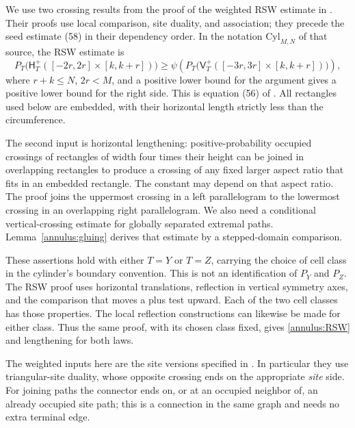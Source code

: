 We use two crossing results from the proof of the weighted RSW estimate
in \cite[Appendix~A, pp.~46--47]{GL2025}.  Their proofs use local
comparison, site duality, and association; they precede the seed estimate
(58) in their dependency order.  In the notation $\mathrm{Cyl}_{M,N}$
of that source, the RSW estimate is
\begin{equation}\label{annulus:RSW}
 P_T\bigl(\mathsf H_T^+([-2r,2r]\times[k,k+r])\bigr)
 \geq
 \psi\!\left(P_T\bigl(\mathsf V_T^+([-3r,3r]\times[k,k+r])\bigr)\right),
\end{equation}
where $r+k\leq N$, $2r<M$, and a positive lower bound for the argument
gives a positive lower bound for the right side.  This is equation (56)
of \cite{GL2025}.  All rectangles used below are embedded, with their
horizontal length strictly less than the circumference.

The second input is horizontal lengthening: positive-probability
occupied crossings of rectangles of width four times their height can
be joined in overlapping rectangles to produce a crossing of any fixed
larger aspect ratio that fits in an embedded rectangle.  The constant
may depend on that aspect ratio.  The proof joins the uppermost crossing
in a left parallelogram to the lowermost crossing in an overlapping right
parallelogram.  We also need a conditional vertical-crossing estimate for globally
separated extremal paths.  Lemma~\ref{annulus:gluing} derives that
estimate by a stepped-domain comparison.

These assertions hold with either $T=Y$ or $T=Z$, carrying the choice
of cell class in the cylinder's boundary convention.  This is not an
identification of $P_Y$ and $P_Z$.  The RSW proof uses horizontal
translations, reflection in vertical symmetry axes, and the comparison
that moves a plus test upward.  Each of the two cell classes has those
properties.  The local reflection constructions can likewise be made
for either class.  Thus the same proof, with its chosen class fixed,
gives \eqref{annulus:RSW} and lengthening for both laws.

The weighted inputs here are the site versions specified in
\cite[Section~3.9 and Lemma~3.17]{GL2025}.  In particular they use
triangular-site duality, whose opposite crossing ends on the appropriate
\emph{site} side.  For joining paths the connector
ends on, or at an occupied neighbor of, an already occupied site path;
this is a connection in the same graph and needs no extra terminal edge.



